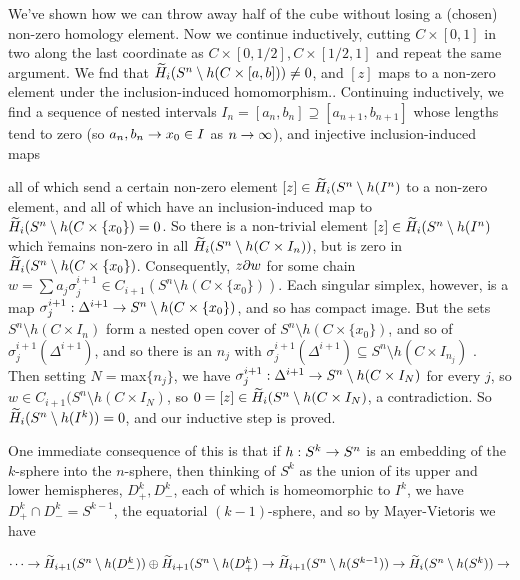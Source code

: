 \msk

We've shown how we can throw away half of the cube without losing a (chosen)
non-zero homology element.
Now we continue inductively, cutting $C\times [0,1]$ in two along the last coordinate as
$C\times [0,1/2],C\times [1/2,1]$ and repeat the same argument. We fnd that
$\widetilde{H}_i(S^n\setminus h(C\times [a,b]))\neq 0$, and $[z]$ maps to a non-zero 
element under the inclusion-induced homomorphism.. Continuing inductively, we find a
sequence of nested intervals $I_n=[a_n,b_n]\supseteq [a_{n+1},b_{n+1}]$ 
whose lengths tend to zero (so $a_n,b_n\rightarrow x_0\in I$ as $n\rightarrow\infty$), and injective inclusion-induced maps


all of which send a certain non-zero element $[z]\in\widetilde{H}_i(S^n\setminus h(I^n)$ to 
a non-zero element, and all of which have an inclusion-induced map to $\widetilde{H}_i(S^n\setminus h(C\times \{x_0\}) = 0$.
So there is a non-trivial element $[z]\in \widetilde{H}_i(S^n\setminus h(I^n)$ which \u{remains}
non-zero in all $\widetilde{H}_i(S^n\setminus h(C\times I_n))$, but is zero in $\widetilde{H}_i(S^n\setminus h(C\times \{x_0\})$.
Consequently, $z\partial w$ for some chain $w=\sum a_j\sigma_j^{i+1}\in C_{i+1}(S^n\setminus h(C\times \{x_0\}))$.
Each singular simplex, however, is a map $\sigma_j^{i+1}:\Delta^{i+1}\rightarrow S^n\setminus h(C\times \{x_0\})$,
and so has compact image. But the sets $S^n\setminus h(C\times I_n)$ form a nested open cover of
$S^n\setminus h(C\times \{x_0\})$, and so of $\sigma_j^{i+1}(\Delta^{i+1})$, and so there is an
$n_j$ with $\sigma_j^{i+1}(\Delta^{i+1})\subseteq S^n\setminus h(C\times I_{n_j})$ .
Then setting $N=$max$\{n_j\}$, we have $\sigma_j^{i+1}:\Delta^{i+1}\rightarrow S^n\setminus h(C\times I_N)$
for every $j$,
so $w\in C_{i+1}(S^n\setminus h(C\times I_N)$, so $0=[z]\in \widetilde{H}_i(S^n\setminus h(C\times I_N)$,
a contradiction. So $\widetilde{H}_i(S^n\setminus h(I^k))=0$, and our inductive step is proved.

\msk

One immediate consequence of this is that if $h:S^k\rightarrow S^n$ is an embedding of the $k$-sphere into the $n$-sphere,
then thinking of $S^k$ as the union of its upper and lower hemispheres, $D^k_+,D^k_-$, each of which is homeomorphic
to $I^k$, we have  $D^k_+\cap D^k_-=S^{k-1}$, the equatorial $(k-1)$-sphere, and so by Mayer-Vietoris we have

\ssk

$\cdots \rightarrow 
\widetilde{H}_{i+1}(S^n\setminus h(D^k_-))\oplus \widetilde{H}_{i+1}(S^n\setminus h(D^k_+)\rightarrow
\widetilde{H}_{i+1}(S^n\setminus h(S^{k-1}))\rightarrow \widetilde{H}_{i}(S^n\setminus h(S^k))\rightarrow$


